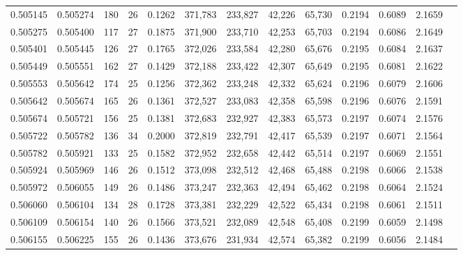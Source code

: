 \begin{tabular}{rrrrrrrrrrrrr}
0.505145 & 0.505274 & 180 &  26 &                                     0.1262 & 371,783 & 233,827 &  42,226 &  65,730 & 0.2194 & 0.6089 & 2.1659 \\
0.505275 & 0.505400 & 117 &  27 &                                     0.1875 & 371,900 & 233,710 &  42,253 &  65,703 & 0.2194 & 0.6086 & 2.1649 \\
0.505401 & 0.505445 & 126 &  27 &                                     0.1765 & 372,026 & 233,584 &  42,280 &  65,676 & 0.2195 & 0.6084 & 2.1637 \\
0.505449 & 0.505551 & 162 &  27 &                                     0.1429 & 372,188 & 233,422 &  42,307 &  65,649 & 0.2195 & 0.6081 & 2.1622 \\
0.505553 & 0.505642 & 174 &  25 &                                     0.1256 & 372,362 & 233,248 &  42,332 &  65,624 & 0.2196 & 0.6079 & 2.1606 \\
0.505642 & 0.505674 & 165 &  26 &                                     0.1361 & 372,527 & 233,083 &  42,358 &  65,598 & 0.2196 & 0.6076 & 2.1591 \\
0.505674 & 0.505721 & 156 &  25 &                                     0.1381 & 372,683 & 232,927 &  42,383 &  65,573 & 0.2197 & 0.6074 & 2.1576 \\
0.505722 & 0.505782 & 136 &  34 &                                     0.2000 & 372,819 & 232,791 &  42,417 &  65,539 & 0.2197 & 0.6071 & 2.1564 \\
0.505782 & 0.505921 & 133 &  25 &                                     0.1582 & 372,952 & 232,658 &  42,442 &  65,514 & 0.2197 & 0.6069 & 2.1551 \\
0.505924 & 0.505969 & 146 &  26 &                                     0.1512 & 373,098 & 232,512 &  42,468 &  65,488 & 0.2198 & 0.6066 & 2.1538 \\
0.505972 & 0.506055 & 149 &  26 &                                     0.1486 & 373,247 & 232,363 &  42,494 &  65,462 & 0.2198 & 0.6064 & 2.1524 \\
0.506060 & 0.506104 & 134 &  28 &                                     0.1728 & 373,381 & 232,229 &  42,522 &  65,434 & 0.2198 & 0.6061 & 2.1511 \\
0.506109 & 0.506154 & 140 &  26 &                                     0.1566 & 373,521 & 232,089 &  42,548 &  65,408 & 0.2199 & 0.6059 & 2.1498 \\
0.506155 & 0.506225 & 155 &  26 &                                     0.1436 & 373,676 & 231,934 &  42,574 &  65,382 & 0.2199 & 0.6056 & 2.1484 \\

\end{tabular}
